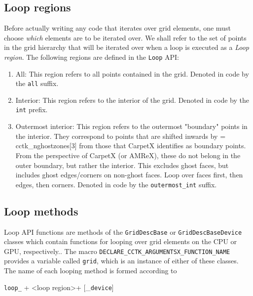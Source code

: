 \subsection{Loop regions}
\label{sec:loop_regions}

Before actually writing any code that iterates over grid elements, one must choose \textit{which} elements are to be iterated over. We shall refer to the set of points in the grid hierarchy that will be iterated over when a loop is executed as a \textit{Loop region}. The following regions are defined in the \texttt{Loop} API:

\begin{enumerate}
    \item All: This region refers to all points contained in the grid. Denoted in code by the \texttt{all} suffix.
    
    \item Interior: This region refers to the interior of the grid. Denoted in code by the \texttt{int} prefix.
    
    \item Outermost interior: This region refers to the outermost "boundary" points in the interior. They correspond to points that are shifted inwards by = cctk\_nghostzones[3] from those that CarpetX identifies as boundary points. From the perspective of CarpetX (or AMReX), these do not belong in the outer boundary, but rather the interior. This excludes ghost faces, but includes ghost edges/corners on non-ghost faces. Loop over faces first, then edges, then corners. Denoted in code by the \texttt{outermost\_int} suffix.
\end{enumerate}


\subsection{Loop methods}
\label{sec:loop_methods}

Loop API functions are methods of the \texttt{GridDescBase} or \texttt{GridDescBaseDevice} classes which contain functions for looping over grid elements on the CPU or GPU, respectively.. The macro \texttt{DECLARE\_CCTK\_ARGUMENTSX\_FUNCTION\_NAME} provides a variable called \texttt{grid}, which is an instance of either of these classes. The name of each looping method is formed according to
%
\begin{center}
    \texttt{loop\_} + \textless loop region\textgreater + [\_\texttt{device}]
\end{center}

